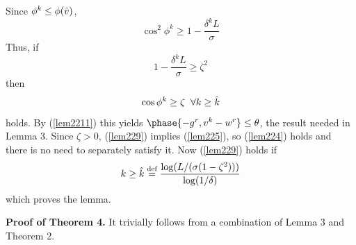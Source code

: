 Since $\phi^k\le \phi(\hat{v})$,
\begin{equation}
\cos^2 \phi^k \ge 1-\frac{\delta^kL}{\sigma}
\label{lem228}
\end{equation}
Thus, if
\begin{equation}
1-\frac{\delta^kL}{\sigma} \ge \zeta^2
\label{lem229}
\end{equation}
then
\begin{equation}
\cos \phi^k \ge \zeta \;\; \forall k\ge \hat{k}
\label{22b}
\end{equation}
holds. By (\ref{lem2211}) this yields $\phase{-g^r,v^k-w^r} \le \theta$, the result needed in Lemma 3. Since $\zeta>0$, (\ref{lem229}) implies (\ref{lem225}), so (\ref{lem224}) holds and there is no need to separately satisfy it. Now (\ref{lem229}) holds if
\begin{equation}
k \ge \hat{k} \stackrel{\text{def}}{=} \frac{\log (L/(\sigma(1-\zeta^2)))}{\log(1/\delta)}
\label{lem2210}
\end{equation}
which proves the lemma.

{\bf Proof of Theorem 4.} It trivially follows from a combination of Lemma 3 and Theorem 2.

